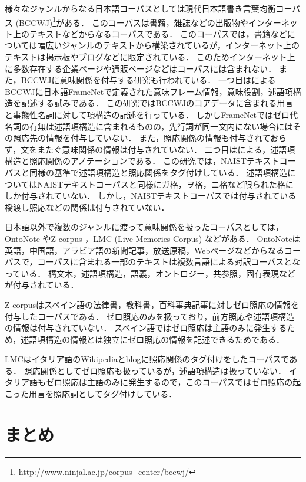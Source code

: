 \documentclass[japanese]{jnlp_1.4}
\begin{document}
様々なジャンルからなる日本語コーパスとしては現代日本語書き言葉均衡コーパス (BCCWJ)\footnote{http://www.ninjal.ac.jp/corpus\_center/bccwj/}がある．
このコーパスは書籍，雑誌などの出版物やインターネット上のテキストなどからなるコーパスである．
このコーパスでは，書籍などについては幅広いジャンルのテキストから構築されているが，インターネット上のテキストは掲示板やブログなどに限定されている．
このためインターネット上に多数存在する企業ページや通販ページなどはコーパスには含まれない．
また，BCCWJに意味関係を付与する研究も行われている．
一つ目は\cite{JapaneseFrameNet}によるBCCWJに日本語FrameNetで定義された意味フレーム情報，意味役割，述語項構造を記述する試みである．
この研究ではBCCWJのコアデータに含まれる用言と事態性名詞に対して項構造の記述を行っている．
しかしFrameNetではゼロ代名詞の有無は述語項構造に含まれるものの，先行詞が同一文内にない場合にはその照応先の情報を付与していない．
また，照応関係の情報も付与されておらず，文をまたぐ意味関係の情報は付与されていない．
二つ目は\cite{小町2012bccwj}による，述語項構造と照応関係のアノテーションである．
この研究では，NAISTテキストコーパスと同様の基準で述語項構造と照応関係をタグ付けしている．
述語項構造についてはNAISTテキストコーパスと同様にガ格，ヲ格，ニ格など限られた格にしか付与されていない．
しかし，NAISTテキストコーパスでは付与されている橋渡し照応などの関係は付与されていない．


日本語以外で複数のジャンルに渡って意味関係を扱ったコーパスとしては，OntoNote \cite{hovy-EtAl:2006:HLT-NAACL06-Short}やZ-corpus \cite{Z-corpus}，LMC (Live Memories Corpus) \cite{LMC}などがある．
OntoNoteは英語，中国語，アラビア語の新聞記事，放送原稿，Webページなどからなるコーパスで，コーパスに含まれる一部のテキストは複数言語による対訳コーパスとなっている．
構文木，述語項構造，語義，オントロジー，共参照，固有表現などが付与されている．

Z-corpusはスペイン語の法律書，教科書，百科事典記事に対しゼロ照応の情報を付与したコーパスである．
ゼロ照応のみを扱っており，前方照応や述語項構造の情報は付与されていない．
スペイン語ではゼロ照応は主語のみに発生するため，述語項構造の情報とは独立にゼロ照応の情報を記述できるためである．

LMCはイタリア語のWikipediaとblogに照応関係のタグ付けをしたコーパスである．
照応関係としてゼロ照応も扱っているが，述語項構造は扱っていない．
イタリア語もゼロ照応は主語のみに発生するので，このコーパスではゼロ照応の起こった用言を照応詞としてタグ付けしている．


\section{まとめ}
\end{document}
